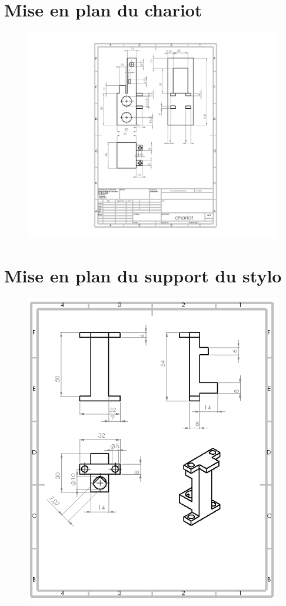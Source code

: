 \begin{changemargin}{-2cm}{-4cm}
\chapter*{Mise en plan du chariot}
\begin{figure}[!h]
 \center
 \includegraphics[scale=1]{../3DModels/chariot.png}
\end{figure}

\chapter*{Mise en plan du support du stylo}
\begin{figure}[!h]
 \center
 \includegraphics[scale=1]{../3DModels/supportstylo.png}
\end{figure}


\end{changemargin}
